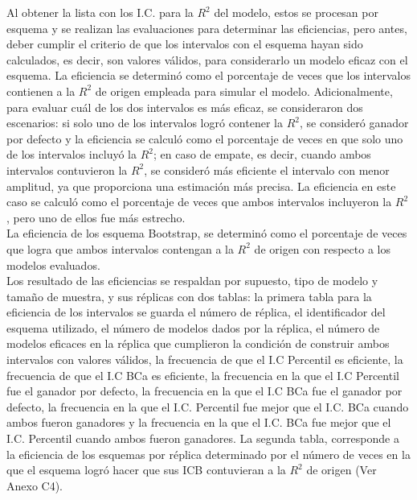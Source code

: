 Al obtener la lista con los I.C. para la $R^2$ del modelo, estos se procesan por esquema y  se realizan las evaluaciones para determinar las eficiencias, pero antes, deber cumplir el criterio de que los intervalos con el esquema hayan sido calculados, es decir, son valores válidos, para considerarlo un modelo eficaz con el esquema. La eficiencia se determinó como el porcentaje de veces que los intervalos contienen a la \( R^2 \) de origen empleada para simular el modelo. Adicionalmente, para evaluar cuál de los dos intervalos es más eficaz, se consideraron dos escenarios: si solo uno de los intervalos logró contener la \( R^2 \), se consideró ganador por defecto y la eficiencia se calculó como el porcentaje de veces en que solo uno de los intervalos incluyó la \( R^2 \); en caso de empate, es decir, cuando ambos intervalos contuvieron la \( R^2 \), se consideró más eficiente el intervalo con menor amplitud, ya que proporciona una estimación más precisa. La eficiencia en este caso se calculó como el porcentaje de veces que ambos intervalos incluyeron la \( R^2 \), pero uno de ellos fue más estrecho.\\

La eficiencia de los esquema Bootstrap, se determinó como el porcentaje de veces que logra que ambos intervalos contengan a la \( R^2 \) de origen con respecto a los modelos evaluados.\\

Los resultado de las eficiencias se respaldan por supuesto, tipo de modelo y tamaño de muestra, y sus réplicas con dos tablas: la primera tabla para la eficiencia de los intervalos se guarda el número de réplica, el identificador del esquema utilizado, el número de modelos dados por la réplica, el número de modelos eficaces en la réplica que cumplieron la condición de construir ambos intervalos con valores válidos, la frecuencia de que el I.C Percentil es eficiente, la frecuencia de que el I.C BCa es eficiente, la frecuencia en la que el I.C Percentil fue el ganador por defecto, la frecuencia en la que el I.C BCa fue el ganador por defecto, la frecuencia en la que el I.C. Percentil fue mejor que el I.C. BCa cuando ambos fueron ganadores y la frecuencia en la que el I.C. BCa fue mejor que el I.C. Percentil cuando ambos fueron ganadores. La segunda tabla, corresponde a la eficiencia de los esquemas por réplica determinado por el número de veces en la que el esquema logró hacer que sus ICB contuvieran a la \( R^2 \) de origen (Ver Anexo C4).\\

